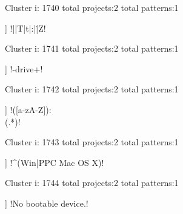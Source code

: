 Cluster i: 1740
total projects:2
total patterns:1
\begin{multicols}{1}
\begin{description}[noitemsep,topsep=0pt]
\item [[2] ] \cverb!\-|\s|T|t|:|\.|Z!
\end{description}
\end{multicols}







Cluster i: 1741
total projects:2
total patterns:1
\begin{multicols}{1}
\begin{description}[noitemsep,topsep=0pt]
\item [[2] ] \cverb!\s-drive\s[^\s]+!
\end{description}
\end{multicols}







Cluster i: 1742
total projects:2
total patterns:1
\begin{multicols}{1}
\begin{description}[noitemsep,topsep=0pt]
\item [[2] ] \cverb!([a-zA-Z]):\\(.*)!
\end{description}
\end{multicols}







Cluster i: 1743
total projects:2
total patterns:1
\begin{multicols}{1}
\begin{description}[noitemsep,topsep=0pt]
\item [[2] ] \cverb!^(Win|PPC Mac OS X)!
\end{description}
\end{multicols}







Cluster i: 1744
total projects:2
total patterns:1
\begin{multicols}{1}
\begin{description}[noitemsep,topsep=0pt]
\item [[2] ] \cverb!No bootable device.!
\end{description}
\end{multicols}







